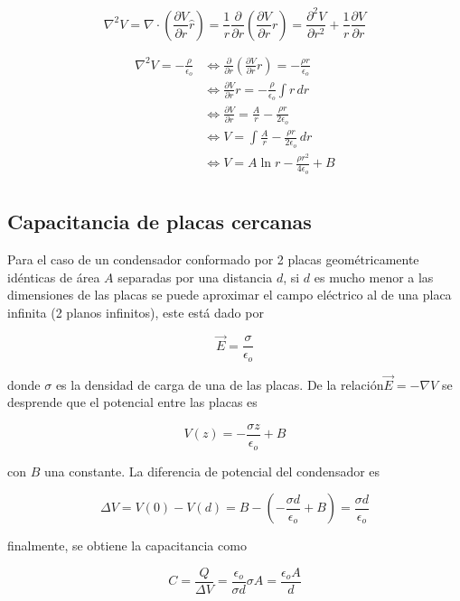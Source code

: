\[\nabla^2V =
\nabla\cdot\left(\frac{\partial V}{\partial r}\hat{r}\right) =
\frac{1}{r}\frac{\partial}{\partial r}\left(\frac{\partial V}{\partial r}r\right) =
\frac{\partial^2 V}{\partial r^2}+\frac{1}{r}\frac{\partial V}{\partial r}
\]

\begin{equation}
\begin{split}
\nabla^2V = -\frac{\rho}{\epsilon_o} & \Leftrightarrow
\frac{\partial}{\partial r}\left(\frac{\partial V}{\partial r}r\right) = -\frac{\rho r}{\epsilon_o}
\\
& \Leftrightarrow \frac{\partial V}{\partial r}r =
-\frac{\rho}{\epsilon_o}\int r\,dr
\\
& \Leftrightarrow \frac{\partial V}{\partial r} =
\frac{A}{r} - \frac{\rho r}{2\epsilon_o}
\\
& \Leftrightarrow V =
\int\frac{A}{r} - \frac{\rho r}{2\epsilon_o}\,dr
\\
& \Leftrightarrow V = 
A\ln{r} - \frac{\rho r^2}{4\epsilon_o} + B
\\
\end{split}
\nonumber
\end{equation}

\subsection{Capacitancia de placas cercanas}
\label{C:placas}
Para el caso de un condensador conformado por 2 placas geométricamente idénticas de área $A$ separadas por una distancia $d$, si $d$ es mucho menor a las dimensiones de las placas se puede aproximar el campo eléctrico al de una placa infinita (2 planos infinitos), este está dado por

\[\Vec{E}=\frac{\sigma}{\epsilon_o}\]

donde $\sigma$ es la densidad de carga de una de las placas. De la relación\newline $\Vec{E}=-\nabla V$ se desprende que el potencial entre las placas es

\[V(z) = -\frac{\sigma z}{\epsilon_o}+B\]

con $B$ una constante. La diferencia de potencial del condensador es

\[\Delta V=V(0)-V(d)=B-
\left(-\frac{\sigma d}{\epsilon_o}+B\right) =
\frac{\sigma d}{\epsilon_o}\]

finalmente, se obtiene la capacitancia como

\[C=\frac{Q}{\Delta V}=\frac{\epsilon_o}{\sigma d}\sigma A=
\frac{\epsilon_o A}{d}\]

